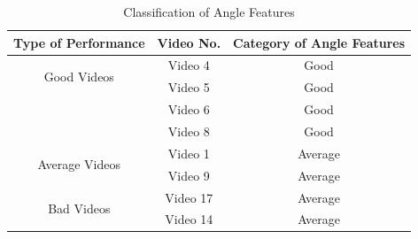 \begin{table}
  \centering
  \begin{tabular}{|c|c|c|}
    \hline
    Type of Performance & Video No. & Category of Angle Features   \\
        \hline
        \hline
        \multirow{2}{*}{Good Videos} 
          & Video 4 &  Good \\ \cline{2-3}
          & Video 5 &  Good \\ \cline{2-3}
          & Video 6 &  Good \\ \cline{2-3}
          & Video 8 &  Good \\ \cline{2-3}
          \hline

          \multirow{2}{*}{Average Videos} 
          & Video 1 &  Average  \\ \cline{2-3}
          & Video 9 &  Average  \\ \cline{2-3}
          \hline

          \multirow{2}{*}{Bad Videos} 
          & Video 17 &  Average  \\ \cline{2-3}
          & Video 14 &  Average  \\ \cline{2-3}
          \hline
  \end{tabular}
\caption{Classification of Angle Features}
\label{table:angleClassification}
\end{table}

